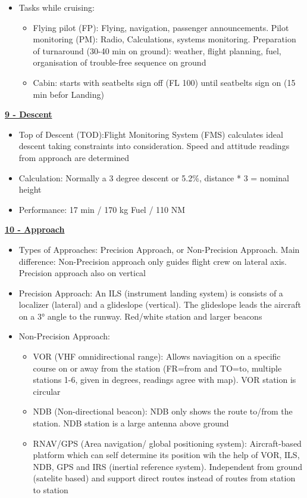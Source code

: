 \documentclass[9pt, landscape, fleqn]{scrartcl}
\begin{document}
\begin{multicols*}{3}
\begin{itemize}
\begin{itemize}
    \end{itemize}
    \item Tasks while cruising: 
    \begin{itemize}
        \item Flying pilot (FP): Flying, navigation, passenger announcements. Pilot monitoring (PM): Radio, Calculations, systems monitoring. Preparation of turnaround (30-40 min on ground): weather, flight planning, fuel, organisation of trouble-free sequence on ground 
        \item Cabin: starts with seatbelts sign off (FL 100) until seatbelts sign on (15 min befor Landing)
    \end{itemize}
    \end{itemize}
\underline{\textbf{9 - Descent}}
\begin{itemize}
    \item Top of Descent (TOD):Flight Monitoring System (FMS) calculates ideal descent taking constraints into consideration. Speed and attitude readings from approach are determined
    \item Calculation: Normally a 3 degree descent or 5.2\%, distance * 3 = nominal height 
    \item Performance: 17 min / 170 kg Fuel / 110 NM 
\end{itemize}
\underline{\textbf{10 - Approach}}
\begin{itemize}
    \item Types of Approaches: Precision Approach, or Non-Precision Approach. Main difference: Non-Precision approach only guides flight crew on lateral axis. Precision approach also on vertical 
    \item Precision Approach: An ILS (instrument landing system) is consists of a localizer (lateral) and a glideslope (vertical). The glideslope leads the aircraft on a 3° angle to the runway. Red/white station and larger beacons
    \item Non-Precision Approach:
    \begin{itemize}
        \item VOR (VHF omnidirectional range): Allows naviagition on a specific course on or away from the station (FR=from and TO=to, multiple stations 1-6, given in degrees, readings agree with map). VOR station is circular
        \item NDB (Non-directional beacon): NDB only shows the route to/from the station. NDB station is a large antenna above ground 
        \item RNAV/GPS (Area navigation/ global positioning system): Aircraft-based platform which can self determine its position wih the help of VOR, ILS, NDB, GPS and IRS (inertial reference system). Independent from ground (satelite based) and support direct routes instead of routes from station to station

\end{itemize}
\end{itemize}
\end{multicols*}
\end{document}
